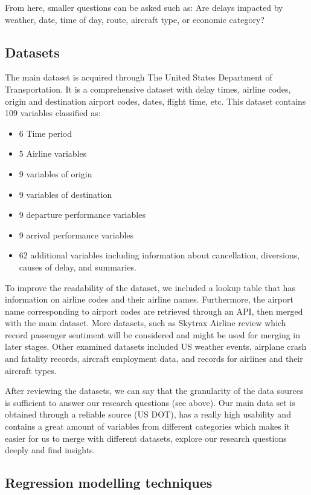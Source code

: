 \documentclass[
]{article}
\providecommand{\tightlist}{%
  \setlength{\itemsep}{0pt}\setlength{\parskip}{0pt}}
\begin{document}
From here, smaller questions can be asked such as: Are delays impacted
by weather, date, time of day, route, aircraft type, or economic
category?

\hypertarget{datasets}{%
\subsection{Datasets}\label{datasets}}

The main dataset is acquired through The United States Department of
Transportation. It is a comprehensive dataset with delay times, airline
codes, origin and destination airport codes, dates, flight time, etc.
This dataset contains 109 variables classified as:

\begin{itemize}
\tightlist
\item
  6 Time period
\item
  5 Airline variables
\item
  9 variables of origin
\item
  9 variables of destination
\item
  9 departure performance variables
\item
  9 arrival performance variables
\item
  62 additional variables including information about cancellation,
  diversions, causes of delay, and summaries.
\end{itemize}

To improve the readability of the dataset, we included a lookup table
that has information on airline codes and their airline names.
Furthermore, the airport name corresponding to airport codes are
retrieved through an API, then merged with the main dataset. More
datasets, such as Skytrax Airline review which record passenger
sentiment will be considered and might be used for merging in later
stages. Other examined datasets included US weather events, airplane
crash and fatality records, aircraft employment data, and records for
airlines and their aircraft types.

After reviewing the datasets, we can say that the granularity of the
data sources is sufficient to answer our research questions (see above).
Our main data set is obtained through a reliable source (US DOT), has a
really high usability and contains a great amount of variables from
different categories which makes it easier for us to merge with
different datasets, explore our research questions deeply and find
insights.

\hypertarget{regression-modelling-techniques}{%
\subsection{Regression modelling
techniques}\label{regression-modelling-techniques}}
\end{document}
